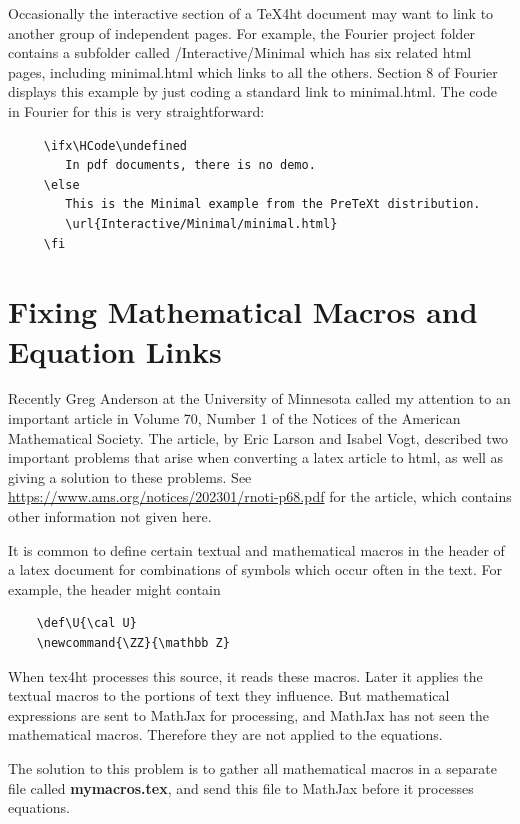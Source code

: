 \documentclass[11pt, oneside]{article}   	%
\begin{document}
Occasionally the interactive section of a TeX4ht document may want to link to another
group of independent pages. For example, the Fourier project folder contains a subfolder
called /Interactive/Minimal which has six related html pages, including minimal.html which
links to all the others. Section 8 of Fourier
displays this example by just coding a standard link to minimal.html. The code in Fourier
for this is very straightforward:
\begin{verbatim}
     \ifx\HCode\undefined
        In pdf documents, there is no demo.
     \else
        This is the Minimal example from the PreTeXt distribution. 
        \url{Interactive/Minimal/minimal.html}
     \fi
\end{verbatim}

\newpage

\section{Fixing Mathematical Macros and Equation Links}

Recently Greg Anderson at the University of Minnesota called my attention to an important
article in Volume 70, Number 1 of the Notices of the American Mathematical Society. The
article, by Eric Larson and Isabel Vogt, described two important problems that arise when
converting a latex article to html, as well as giving a solution to these problems. See
\url{https://www.ams.org/notices/202301/rnoti-p68.pdf} for the article, which contains other
information not given here.


It is common to define certain textual and mathematical macros in the header of a latex document for
combinations of symbols which occur often in the text. For example, the header might contain
\begin{verbatim}
    \def\U{\cal U}
    \newcommand{\ZZ}{\mathbb Z}
\end{verbatim}
When tex4ht processes this source, it reads these macros. Later it applies the textual macros
to the portions of text they influence. But mathematical expressions are sent to MathJax for
processing, and MathJax has not seen the mathematical macros. Therefore they are not applied to the
equations.

The solution to this problem is to gather  all mathematical macros in a separate
file called  {\bf mymacros.tex}, and send this file to MathJax before it processes equations. 
\end{document}
